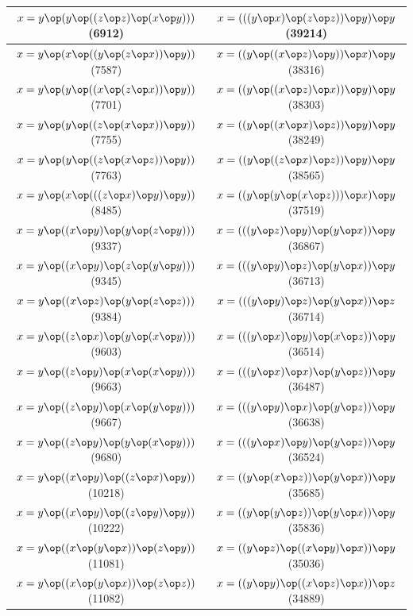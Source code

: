 \begin{table}[h]
\begin{tabular}{|c|c|}
$x = y \op (y \op ((z \op z) \op (x \op y)))$ (6912) & $x = (((y \op x) \op (z \op z)) \op y) \op y$ (39214) \\ \hline
$x = y \op (x \op ((y \op (z \op x)) \op y))$ (7587) & $x = ((y \op ((x \op z) \op y)) \op x) \op y$ (38316) \\ \hline
$x = y \op (y \op ((x \op (z \op x)) \op y))$ (7701) & $x = ((y \op ((x \op z) \op x)) \op y) \op y$ (38303) \\ \hline
$x = y \op (y \op ((z \op (x \op x)) \op y))$ (7755) & $x = ((y \op ((x \op x) \op z)) \op y) \op y$ (38249) \\ \hline
$x = y \op (y \op ((z \op (x \op z)) \op y))$ (7763) & $x = ((y \op ((z \op x) \op z)) \op y) \op y$ (38565) \\ \hline
$x = y \op (x \op (((z \op x) \op y) \op y))$ (8485) & $x = ((y \op (y \op (x \op z))) \op x) \op y$ (37519) \\ \hline
$x = y \op ((x \op y) \op (y \op (z \op y)))$ (9337) & $x = (((y \op z) \op y) \op (y \op x)) \op y$ (36867) \\ \hline
$x = y \op ((x \op y) \op (z \op (y \op y)))$ (9345) & $x = (((y \op y) \op z) \op (y \op x)) \op y$ (36713) \\ \hline
$x = y \op ((x \op z) \op (y \op (z \op z)))$ (9384) & $x = (((y \op y) \op z) \op (y \op x)) \op z$ (36714) \\ \hline
$x = y \op ((z \op x) \op (y \op (x \op y)))$ (9603) & $x = (((y \op x) \op y) \op (x \op z)) \op y$ (36514) \\ \hline
$x = y \op ((z \op y) \op (x \op (x \op y)))$ (9663) & $x = (((y \op x) \op x) \op (y \op z)) \op y$ (36487) \\ \hline
$x = y \op ((z \op y) \op (x \op (y \op y)))$ (9667) & $x = (((y \op y) \op x) \op (y \op z)) \op y$ (36638) \\ \hline
$x = y \op ((z \op y) \op (y \op (x \op y)))$ (9680) & $x = (((y \op x) \op y) \op (y \op z)) \op y$ (36524) \\ \hline
$x = y \op ((x \op y) \op ((z \op x) \op y))$ (10218) & $x = ((y \op (x \op z)) \op (y \op x)) \op y$ (35685) \\ \hline
$x = y \op ((x \op y) \op ((z \op y) \op y))$ (10222) & $x = ((y \op (y \op z)) \op (y \op x)) \op y$ (35836) \\ \hline
$x = y \op ((x \op (y \op x)) \op (z \op y))$ (11081) & $x = ((y \op z) \op ((x \op y) \op x)) \op y$ (35036) \\ \hline
$x = y \op ((x \op (y \op x)) \op (z \op z))$ (11082) & $x = ((y \op y) \op ((x \op z) \op x)) \op z$ (34889) \\ \hline

\end{tabular}
\end{table}
